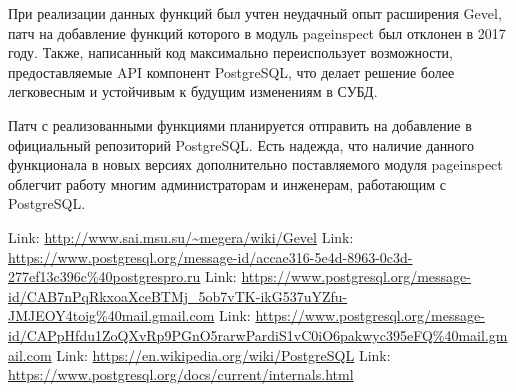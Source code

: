 \documentclass[12pt,oneside]{amsart}
\begin{document}
При реализации данных функций был учтен неудачный опыт расширения Gevel, патч на добавление функций которого в модуль pageinspect был отклонен в 2017 году. Также, написанный код максимально переиспользует возможности, предоставляемые API компонент PostgreSQL, что делает решение более легковесным и устойчивым к будущим изменениям в СУБД.

Патч с реализованными функциями планируется отправить на добавление в официальный репозиторий PostgreSQL. Есть надежда, что наличие данного функционала в новых версиях дополнительно поставляемого модуля pageinspect облегчит работу многим администраторам и инженерам, работающим с PostgreSQL.



%
%
\newpage
\begin{thebibliography}{1}
	 Link: \url{http://www.sai.msu.su/~megera/wiki/Gevel}
	 Link: \url{https://www.postgresql.org/message-id/accae316-5e4d-8963-0c3d-277ef13c396c%40postgrespro.ru}
	 Link: \url{https://www.postgresql.org/message-id/CAB7nPqRkxoaXceBTMj_5ob7vTK-ikG537uYZfu-JMJEOY4toig%40mail.gmail.com}
	 Link: \url{https://www.postgresql.org/message-id/CAPpHfdu1ZoQXvRp9PGnO5rarwPardiS1vC0iO6pakwyc395eFQ%40mail.gmail.com}
	 Link: \url{https://en.wikipedia.org/wiki/PostgreSQL}
	 Link: \url{https://www.postgresql.org/docs/current/internals.html}
\end{thebibliography}
\end{document}
